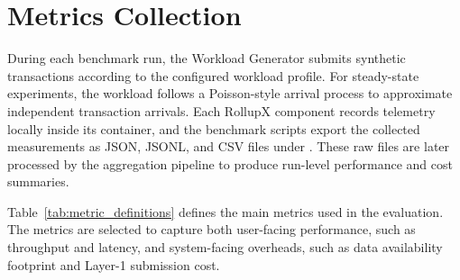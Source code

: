 
\section{Metrics Collection}
\label{sec:metrics_collection}

During each benchmark run, the Workload Generator submits synthetic transactions according to the configured workload profile. For steady-state experiments, the workload follows a Poisson-style arrival process to approximate independent transaction arrivals. Each RollupX component records telemetry locally inside its container, and the benchmark scripts export the collected measurements as JSON, JSONL, and CSV files under . These raw files are later processed by the aggregation pipeline to produce run-level performance and cost summaries.

Table~\ref{tab:metric_definitions} defines the main metrics used in the evaluation. The metrics are selected to capture both user-facing performance, such as throughput and latency, and system-facing overheads, such as data availability footprint and Layer-1 submission cost.

